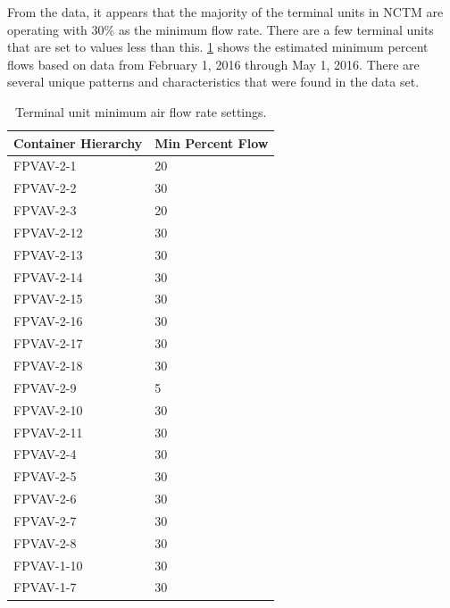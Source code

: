 From the data, it appears that the majority of the terminal units in NCTM are operating with 30\% as the minimum flow rate. There are a few terminal units that are set to values less than this. \tableref{} \ref{tab:MinimumAirFlowRateSettings} shows the estimated minimum percent flows based on data from February 1, 2016 through May 1, 2016. There are several unique patterns and characteristics that were found in the data set.




\begin{table}[]
\centering
\caption{Terminal unit minimum air flow rate settings.}
\label{tab:MinimumAirFlowRateSettings}
\begin{tabular}{ll}
    \toprule
Container Hierarchy & Min Percent Flow \\ \midrule
FPVAV-2-1           & 20               \\
FPVAV-2-2           & 30               \\
FPVAV-2-3           & 20               \\
FPVAV-2-12          & 30               \\
FPVAV-2-13          & 30               \\
FPVAV-2-14          & 30               \\
FPVAV-2-15          & 30               \\
FPVAV-2-16          & 30               \\
FPVAV-2-17          & 30               \\
FPVAV-2-18          & 30               \\
FPVAV-2-9           & 5                \\
FPVAV-2-10          & 30               \\
FPVAV-2-11          & 30               \\
FPVAV-2-4           & 30               \\
FPVAV-2-5           & 30               \\
FPVAV-2-6           & 30               \\
FPVAV-2-7           & 30               \\
FPVAV-2-8           & 30               \\
FPVAV-1-10          & 30               \\
FPVAV-1-7           & 30               \\

\end{tabular}
\end{table}
